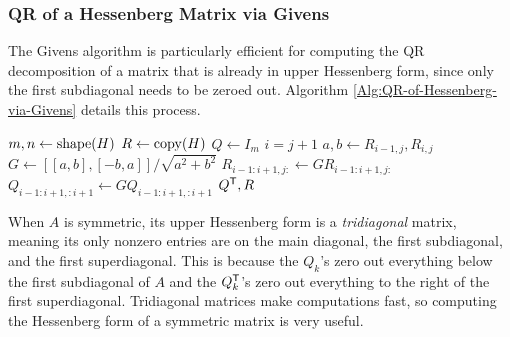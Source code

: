 \begin{comment}
\begin{info} %
Like Householder transformations, Givens rotations are orthonormal, and therefore numerically stable.
In addition, they affect only a small part of the array at each iteration, making them ideal for some problems.

In general, however, Algorithm \ref{Alg:QR-via-Givens} requires more floating point operations than Algorithm \ref{Alg:QR-via-Householder}.
On the other hand, the Givens algorithm can be \emph{parallelized}, meaning that multiple processors can be used to simultaneously carry out different iterations of the algorithm.
\end{info}
\end{comment}

\subsubsection*{QR of a Hessenberg Matrix via Givens} %

The Givens algorithm is particularly efficient for computing the QR decomposition of a matrix that is already in upper Hessenberg form, since only the first subdiagonal needs to be zeroed out.
Algorithm \ref{Alg:QR-of-Hessenberg-via-Givens} details this process.

\begin{algorithm}[H]
\begin{algorithmic}[1]
\State $m, n \gets \mathrm{shape}(H)$
\State $R \gets \mathrm{copy}(H)$
\State $Q \gets I_{m}$
    \State $i = j+1$
    \State $a, b \gets R_{i-1,j}, R_{i,j}$
    \State $G \gets [[a, b],[-b,a]]/\sqrt{a^2+b^2}$
    \State $R_{i-1:i+1,j:} \gets GR_{i-1:i+1, j:}$
    \State $Q_{i-1:i+1,:i+1} \gets GQ_{i-1:i+1,:i+1}$
\EndFor
\State {} $Q^{\mathsf T} , R$
\EndProcedure
\end{algorithmic}
\caption{}
\label{Alg:QR-of-Hessenberg-via-Givens}
\end{algorithm}

\begin{info} %
When $A$ is symmetric, its upper Hessenberg form is a \emph{tridiagonal} matrix, meaning its only nonzero entries are on the main diagonal, the first subdiagonal, and the first superdiagonal.
This is because the $Q_k$'s zero out everything below the first subdiagonal of $A$ and the $Q_k^{\mathsf T}$'s zero out everything to the right of the first superdiagonal.
Tridiagonal matrices make computations fast, so computing the Hessenberg form of a symmetric matrix is very useful.
\end{info}
